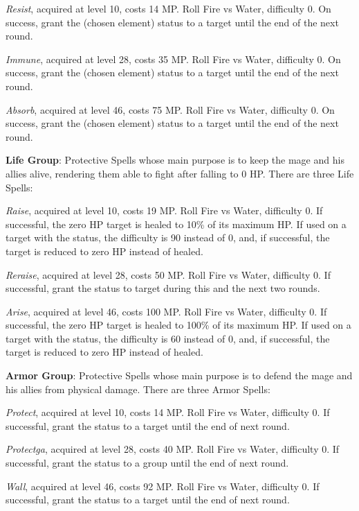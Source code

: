 \begin{multicols}{2}
    \textit{Resist}, acquired at level 10, costs 14 MP. Roll Fire vs Water, difficulty 0. On success, grant the  (chosen element) status to a target until the end of the next round.

    \textit{Immune}, acquired at level 28, costs 35 MP. Roll Fire vs Water, difficulty 0. On success, grant the  (chosen element) status to a target until the end of the next round.

    \textit{Absorb}, acquired at level 46, costs 75 MP. Roll Fire vs Water, difficulty 0. On success, grant the  (chosen element) status to a target until the end of the next round.

    \textbf{Life Group}: Protective Spells whose main purpose is to keep the mage and his allies alive, rendering them able to fight after falling to 0 HP. There are three Life Spells:

    \textit{Raise}, acquired at level 10, costs 19 MP. Roll Fire vs Water, difficulty 0. If successful, the zero HP target is healed to 10\% of its maximum HP. If used on a target with the  status, the difficulty is 90 instead of 0, and, if successful, the target is reduced to zero HP instead of healed.

    \textit{Reraise}, acquired at level 28, costs 50 MP. Roll Fire vs Water, difficulty 0. If successful, grant the  status to target during this and the next two rounds.

    \textit{Arise}, acquired at level 46, costs 100 MP. Roll Fire vs Water, difficulty 0. If successful, the zero HP target is healed to 100\% of its maximum HP. If used on a target with the  status, the difficulty is 60 instead of 0, and, if successful, the target is reduced to zero HP instead of healed.

    \textbf{Armor Group}: Protective Spells whose main purpose is to defend the mage and his allies from physical damage. There are three Armor Spells:

    \textit{Protect}, acquired at level 10, costs 14 MP. Roll Fire vs Water, difficulty 0. If successful, grant the  status to a target until the end of next round.

    \textit{Protectga}, acquired at level 28, costs 40 MP. Roll Fire vs Water, difficulty 0. If successful, grant the  status to a group until the end of next round.

    \textit{Wall}, acquired at level 46, costs 92 MP. Roll Fire vs Water, difficulty 0. If successful, grant the  status to a target until the end of next round.


\end{multicols}
